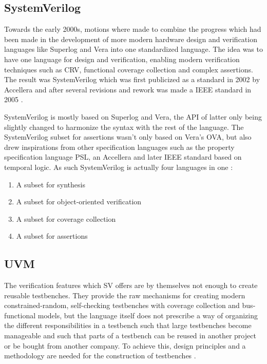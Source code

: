 \documentclass[12pt]{report}
\begin{document}
\subsection{SystemVerilog} %

Towards the early 2000s, motions where made to combine the progress which had been made in the development of more
modern hardware design and verification languages like Superlog and Vera into one standardized language. The idea was
to have one language for design and verification, enabling modern verification techniques such as CRV, functional
coverage collection and complex assertions. The result was SystemVerilog which was first publicized as a standard in
2002 by Accellera and after several revisions and rework was made a IEEE standard in 2005 \cite[Sec. 9]{flake2020a}.

SystemVerilog is mostly based on Superlog and Vera, the API of latter only being slightly changed to harmonize the
syntax with the rest of the language. The SystemVerilog subset for assertions wasn't only based on Vera's OVA, but
also drew inspirations from other specification languages such as the property specification language PSL, an
Accellera and later IEEE standard based on temporal logic. As such SystemVerilog is actually four languages in one
\cite[Ch. 1]{mehta2021introduction}:

\begin{enumerate}
  \item A subset for synthesis
  \item A subset for object-oriented verification
  \item A subset for coverage collection
  \item A subset for assertions
\end{enumerate}

\subsection{UVM} %

The verification features which SV offers are by themselves not enough to create reusable testbenches. They provide
the raw mechanisms for creating modern constrained-random, self-checking testbenches with coverage collection and
bus-functional models, but the language itself does not prescribe a way of organizing the different responsibilities
in a testbench such that large testbenches become manageable and such that parts of a testbench can be reused in
another project or be bought from another company. To achieve this, design principles and a methodology are needed for
the construction of testbenches \cite[Sec. 9.2]{flake2020a}.
\end{document}
